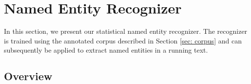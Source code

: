 \documentclass[11pt]{article}
\begin{document}







\section{Named Entity Recognizer}
\label{sec: named entity recognizer}

In this section, we present our statistical named entity recognizer. The recognizer is trained using the annotated corpus described in Section \ref{sec: corpus} and can subsequently be applied to extract named entities in a running text. 

\subsection{Overview}
\end{document}
